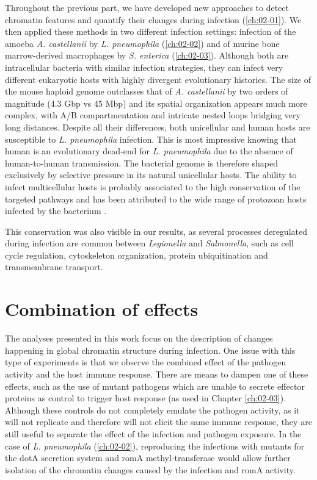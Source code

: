 Throughout the previous part, we have developed new approaches to detect chromatin features and quantify their changes during infection (\autoref{ch:02-01}). We then applied these methods in two different infection settings: infection of the amoeba \textit{A. castellanii} by \textit{L. pneumophila} (\autoref{ch:02-02}) and of murine bone marrow-derived macrophages by \textit{S. enterica} (\autoref{ch:02-03}). Although both are intracellular bacteria with similar infection strategies, they can infect very different eukaryotic hosts with highly divergent evolutionary histories. The size of the mouse haploid genome outclasses that of \textit{A. castellanii} by two orders of magnitude (4.3 Gbp vs 45 Mbp) and its spatial organization appears much more complex, with A/B compartmentation and intricate nested loops bridging very long distances. Despite all their differences, both unicellular and human hosts are susceptible to \textit{L. pneumophila} infection. This is most impressive knowing that human is an evolutionary dead-end for \textit{L. pneumophila} due to the absence of human-to-human transmission. The bacterial genome is therefore shaped exclusively by selective pressure in its natural unicellular hosts. The ability to infect multicellular hosts is probably associated to the high conservation of the targeted pathways and has been attributed to the wide range of protozoan hosts infected by the bacterium \cite{molofskyDifferentiateThriveLessons2004}.

This conservation was also visible in our results, as several processes deregulated during infection are common between \textit{Legionella} and \textit{Salmonella}, such as cell cycle regulation, cytoskeleton organization, protein ubiquitination and transmembrane transport.


\section{Combination of effects}

The analyses presented in this work focus on the description of changes happening in global chromatin structure during infection. One issue with this type of experiments is that we observe the combined effect of the pathogen activity and the host immune response. There are means to dampen one of these effects, such as the use of mutant pathogens which are unable to secrete effector proteins as control to trigger host response (as used in Chapter \autoref{ch:02-03}). Although these controls do not completely emulate the pathogen activity, as it will not replicate  \cite{vogelConjugativeTransferVirulence1998} and therefore will not elicit the same immune response, they are still useful to separate the effect of the infection and pathogen exposure. In the case of \textit{L. pneumophila} (\autoref{ch:02-02}), reproducing the infections with mutants for the dotA secretion system and romA methyl-transferase would allow further isolation of the chromatin changes caused by the infection and romA activity.

